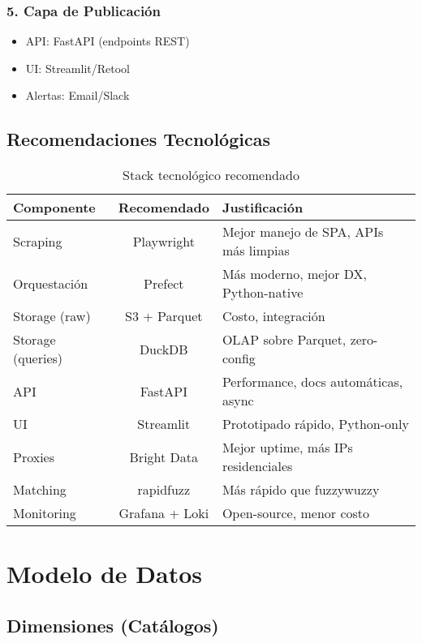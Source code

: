 \documentclass[12pt,a4paper]{article}
\begin{document}
\subsubsection*{5. Capa de Publicación}
\begin{itemize}[leftmargin=*]
    \item API: FastAPI (endpoints REST)
    \item UI: Streamlit/Retool
    \item Alertas: Email/Slack
\end{itemize}

\subsection{Recomendaciones Tecnológicas}

\begin{table}[h]
\centering
\small
\begin{tabularx}{\textwidth}{|X|c|X|}
\hline
\textbf{Componente} & \textbf{Recomendado} & \textbf{Justificación} \\
\hline
Scraping & Playwright & Mejor manejo de SPA, APIs más limpias \\
\hline
Orquestación & Prefect & Más moderno, mejor DX, Python-native \\
\hline
Storage (raw) & S3 + Parquet & Costo, integración \\
\hline
Storage (queries) & DuckDB & OLAP sobre Parquet, zero-config \\
\hline
API & FastAPI & Performance, docs automáticas, async \\
\hline
UI & Streamlit & Prototipado rápido, Python-only \\
\hline
Proxies & Bright Data & Mejor uptime, más IPs residenciales \\
\hline
Matching & rapidfuzz & Más rápido que fuzzywuzzy \\
\hline
Monitoring & Grafana + Loki & Open-source, menor costo \\
\hline
\end{tabularx}
\caption{Stack tecnológico recomendado}
\end{table}

\section{Modelo de Datos}

\subsection{Dimensiones (Catálogos)}
\end{document}
